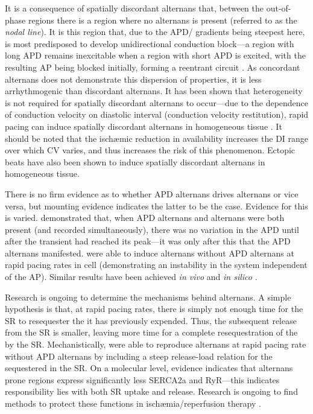\documentclass[../thesis-main.tex]{subfiles}
\begin{document}
It is a consequence of spatially discordant alternans that, between the out-of-phase regions there is a region where no alternans is present (referred to as the \emph{nodal line}). It is this region that, due to the APD/\cai{} gradients being steepest here, is most predisposed to develop unidirectional conduction block---a region with long APD remains inexcitable when a region with short APD is excited, with the resulting AP being blocked initially, forming a reentrant circuit \citep{Laurita2008}. As concordant alternans does not demonstrate this dispersion of properties, it is less arrhythmogenic than discordant alternans. It has been shown that heterogeneity is not required for spatially discordant alternans to occur---due to the dependence of conduction velocity on diastolic interval (conduction velocity restitution), rapid pacing can induce spatially discordant alternans in homogeneous tissue \citep{Watanabe2001}. It should be noted that the isch\ae{}mic reduction in \ina{} availability increases the DI range over which CV varies, and thus increases the risk of this phenomenon. Ectopic beats have also been shown to induce spatially discordant alternans in homogeneous tissue.

There is no firm evidence as to whether APD alternans drives \ca{} alternans or vice versa, but mounting evidence indicates the latter to be the case. Evidence for this is varied. \citet{Lee1988} demonstrated that, when APD alternans and \ca{} alternans were both present (and recorded simultaneously), there was no variation in the APD until after the \ca{} transient had reached its peak---it was only after this that the APD alternans manifested. \citet{Chudin1999} were able to induce \ca{} alternans without APD alternans at rapid pacing rates in cell (demonstrating an instability in the \ca{} system independent of the AP). Similar results have been achieved \emph{in vivo} \citep{Aistrup2006} and \emph{in silico} \citep{Sato2006}.

Research is ongoing to determine the mechanisms behind \ca{} alternans. A simple hypothesis is that, at rapid pacing rates, there is simply not enough time for the SR to resequester the \ca{} it has previously expended. Thus, the subsequent \ca{} release from the SR is smaller, leaving more time for a complete resequestration of the \ca{} by the SR. Mechanistically, \citet{Shiferaw2003} were able to reproduce \ca{} alternans at rapid pacing rate without APD alternans by including a steep release-load relation for the \ca{} sequestered in the SR. On a molecular level, evidence indicates that alternans prone regions express significantly less SERCA2a and RyR---this indicates responsibility lies with both SR uptake and release. Research is ongoing to find methods to protect these functions in isch\ae{}mia/reperfusion therapy \citep{Wang2013}.
\end{document}
